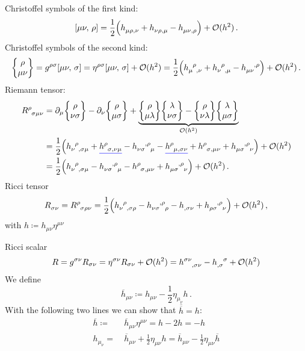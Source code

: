 Christoffel symbols of the first kind:
\begin{equation}
    \csym{\mu}{\nu}{\rho} = \frac{1}{2} \left( \tensor{h}{_\mu_\rho_,_\nu} + \tensor{h}{_\nu_\rho_,_\mu}
    - \tensor{h}{_\mu_\nu_,_\rho} \right) + \landauO(h^2) \, .
\end{equation}
Christoffel symbols of the second kind:
\begin{equation}
    \cSym{\rho}{\mu}{\nu} = g^{\rho\sigma} \csym{\mu}{\nu}{\sigma} = \eta^{\rho\sigma} \csym{\mu}{\nu}{\sigma} + \landauO(h^2)
    = \frac{1}{2} \left( \tensor{h}{_\mu^\rho_,_\nu} + \tensor{h}{_\nu^\rho_,_\mu} - \tensor{h}{_\mu_\nu^,^\rho} \right) + \landauO(h^2) \, .
\end{equation}
Riemann tensor:
\begin{equation}
    \begin{split}
        \tensor{R}{^\rho_\sigma_\mu_\nu}
        &= \partial_\mu \cSym{\rho}{\nu}{\sigma} - \partial_\nu \cSym{\rho}{\mu}{\sigma}
        + \underbrace{\cSym{\rho}{\mu}{\lambda} \cSym{\lambda}{\nu}{\sigma} - \cSym{\rho}{\nu}{\lambda} \cSym{\lambda}{\mu}{\sigma}}_{\landauO(h^2)} \\
        &= \frac{1}{2} \left( \tensor{h}{_\nu^\rho_,_\sigma_\mu} + \mathunderline{blue}{\tensor{h}{^\rho_\sigma_,_\nu_\mu}} - \tensor{h}{_\nu_\sigma^,^\rho_\mu}
        - \mathunderline{blue}{\tensor{h}{^\rho_\mu_,_\sigma_\nu}} + \tensor{h}{^\rho_\sigma_,_\mu_\nu} + \tensor{h}{_\mu_\sigma^,^\rho_\nu} \right) + \landauO(h^2) \\
        &= \frac{1}{2} \left( \tensor{h}{_\nu^\rho_,_\sigma_\mu} - \tensor{h}{_\nu_\sigma^,^\rho_\mu}
        - \tensor{h}{^\rho_\sigma_,_\mu_\nu} + \tensor{h}{_\mu_\sigma^,^\rho_\nu} \right) + \landauO(h^2) \, .
    \end{split}
\end{equation}
Ricci tensor
\begin{equation}
    \tensor{R}{_\sigma_\nu} = \tensor{R}{^\rho_\sigma_\rho_\nu} 
    = \frac{1}{2} \left( \tensor{h}{_\nu^\rho_,_\sigma_\rho} - \tensor{h}{_\nu_\sigma^,^\rho_\rho} 
    - \tensor{h}{_,_\sigma_\nu} + \tensor{h}{_\rho_\sigma^,^\rho_\nu} \right) + \landauO(h^2)\, ,
\end{equation}
with $h\coloneqq h_{\mu\nu}\eta^{\mu\nu}$

Ricci scalar
\begin{equation}
    R = g^{\sigma\nu}R_{\sigma\nu} = \eta^{\sigma\nu}R_{\sigma\nu} + \landauO(h^2) 
    = \tensor{h}{^\sigma^\nu_,_\sigma_\nu} - \tensor{h}{_,_\sigma^\sigma} + \landauO(h^2) 
\end{equation}
We define 
\begin{equation}
    \overline{h}_{\mu\nu} \coloneqq h_{\mu\nu} - \frac{1}{2} \eta_{\mu_\nu}h\,.
\end{equation}
With the following two lines we can show that $\overline{\overline{h}} = h$:
\begin{align}
    \overline{h} \coloneqq &\ \overline{h}_{\mu\nu}\eta^{\mu\nu} = h - 2h = -h \\
    h_{\mu_\nu} =&\ \overline{h}_{\mu\nu} + \frac{1}{2} \eta_{\mu\nu}h = \overline{h}_{\mu\nu} - \frac{1}{2} \eta_{\mu\nu}\overline{h}
\end{align}

